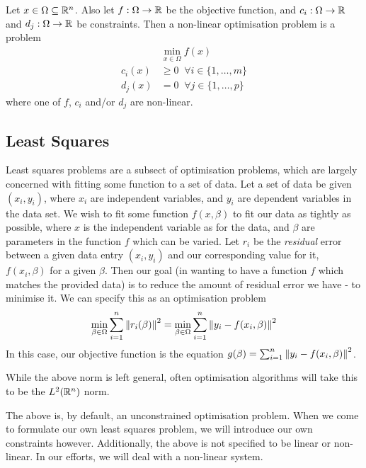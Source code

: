 \begin{definition}
    Let $x \in \Omega \subseteq \mathbb{R}^n$. Also let $f:\Omega \to \mathbb{R}$ be the objective function, and $c_i :\Omega \to \mathbb{R}$ and $d_j : \Omega \to \mathbb{R}$ be 
    constraints. Then a non-linear optimisation problem is a problem
    \begin{align*}
        &\min_{x \in \Omega} f(x) \\
        c_i(x) &\ge 0 \;\; \forall i \in \lbrace 1, \dots, m \rbrace \\
        d_j(x) &= 0 \;\; \forall j \in \lbrace 1, \dots, p \rbrace
    \end{align*}
    where one of $f$, $c_i$ and/or $d_j$ are non-linear.
\end{definition}


\subsection{Least Squares}

Least squares problems are a subsect of optimisation problems, which are largely concerned with fitting some function to 
a set of data. Let a set of data be given $(x_i, y_i)$, where $x_i$ are independent variables, and $y_i$ are dependent variables in 
the data set. We wish to fit some function $f(x, \beta)$ to fit our data as tightly as possible, where $x$ is the independent variable 
as for the data, and $\beta$ are parameters in the function $f$ which can be varied. Let $r_i$ be the \textit{residual} error between 
a given data entry $(x_i, y_i)$ and our corresponding value for it, $f(x_i, \beta)$ for a given $\beta$. Then our goal 
(in wanting to have a function $f$ which matches the provided data) is to reduce the amount of residual error we have - to minimise it. 
We can specify this as an optimisation problem \cite{carlone-least-squares}
\begin{align*}
    \min_{\beta \in \Omega} \sum_{i = 1}^{n} \norm{r_i(\beta)}^2 = \min_{\beta \in \Omega} \sum_{i = 1}^{n} \norm{y_i - f(x_i, \beta)}^2
\end{align*}
In this case, our objective function is the equation $g(\beta) = \sum_{i = 1}^{n} \norm{y_i - f(x_i, \beta)}^2$.

\begin{remark}
    While the above norm is left general, often optimisation algorithms will take this to be the $L^2(\mathbb{R}^n)$ norm.
\end{remark}
\begin{remark}
    The above is, by default, an unconstrained optimisation problem. When we come to formulate our own least squares problem, we will 
    introduce our own constraints however. Additionally, the above is not specified to be linear or non-linear. In our efforts, 
    we will deal with a non-linear system.
\end{remark}

